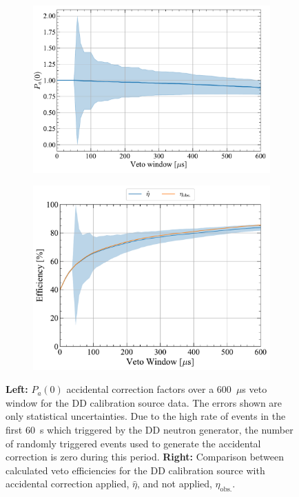\begin{figure}[!ht]
    \centering
    \begin{subfigure}[b]{0.49\textwidth}
        \centering
        \includegraphics[width=\textwidth]{figures/VetoEfficiency/SR3DDdirect_Corrections_100k.pdf}
        \caption{}
        \label{fig:VetoEff/DDAccCorrectionParameters}
    \end{subfigure}
    \hfill
    \begin{subfigure}[b]{0.49\textwidth}
        \centering
        \includegraphics[width=\textwidth]{figures/VetoEfficiency/DDAccidentalCheck.pdf}
        \caption{}
        \label{fig:VetoEff/DDAccCorrectionImpact_P0}
    \end{subfigure}
    \caption{\textbf{Left:} $P_a(0)$ accidental correction factors over a 600~$\mu$s veto window for the DD calibration source data. The errors shown are only statistical uncertainties. Due to the high rate of events in the first 60~\textmu s which triggered by the DD neutron generator, the number of randomly triggered events used to generate the accidental correction is zero during this period. \textbf{Right:} Comparison between calculated veto efficiencies for the DD calibration source with accidental correction applied, $\hat{\eta}$, and not applied, $\eta_\text{obs.}$.}
    \label{fig:VetoEff/DDAccidentalPlots}
\end{figure}

